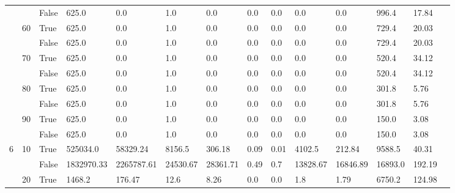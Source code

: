 \documentclass{article}
\begin{document}
\begin{landscape}
\begin{small}
\begin{longtable}[c]{@{}lll|ll|ll|ll|ll|lll@{}}
   &    & False & 625.0           & 0.0            & 1.0           & 0.0           & 0.0           & 0.0           & 0.0           & 0.0           & 996.4         & 17.84       &  \\
   & 60 & True  & 625.0           & 0.0            & 1.0           & 0.0           & 0.0           & 0.0           & 0.0           & 0.0           & 729.4         & 20.03       &  \\
   &    & False & 625.0           & 0.0            & 1.0           & 0.0           & 0.0           & 0.0           & 0.0           & 0.0           & 729.4         & 20.03       &  \\
   & 70 & True  & 625.0           & 0.0            & 1.0           & 0.0           & 0.0           & 0.0           & 0.0           & 0.0           & 520.4         & 34.12       &  \\
   &    & False & 625.0           & 0.0            & 1.0           & 0.0           & 0.0           & 0.0           & 0.0           & 0.0           & 520.4         & 34.12       &  \\
   & 80 & True  & 625.0           & 0.0            & 1.0           & 0.0           & 0.0           & 0.0           & 0.0           & 0.0           & 301.8         & 5.76        &  \\
   &    & False & 625.0           & 0.0            & 1.0           & 0.0           & 0.0           & 0.0           & 0.0           & 0.0           & 301.8         & 5.76        &  \\
   & 90 & True  & 625.0           & 0.0            & 1.0           & 0.0           & 0.0           & 0.0           & 0.0           & 0.0           & 150.0         & 3.08        &  \\
   &    & False & 625.0           & 0.0            & 1.0           & 0.0           & 0.0           & 0.0           & 0.0           & 0.0           & 150.0         & 3.08        &  \\
  \midrule
6  & 10 & True  & 525034.0        & 58329.24       & 8156.5        & 306.18        & 0.09          & 0.01          & 4102.5        & 212.84        & 9588.5        & 40.31       &  \\
   &    & False & 1832970.33      & 2265787.61     & 24530.67      & 28361.71      & 0.49          & 0.7           & 13828.67      & 16846.89      & 16893.0       & 192.19      &  \\
   & 20 & True  & 1468.2          & 176.47         & 12.6          & 8.26          & 0.0           & 0.0           & 1.8           & 1.79          & 6750.2        & 124.98      &  \\

\end{longtable}
\end{small}
\end{landscape}
\end{document}
